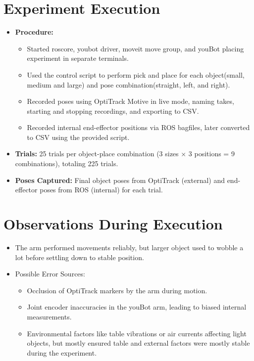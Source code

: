 \documentclass{article}
\begin{document}
\newpage

\section{Experiment Execution}
\begin{itemize}
    \item \textbf{Procedure:} 
    \begin{itemize}
        \item Started roscore, youbot driver, moveit move group, and youBot placing experiment in separate terminals.
        \item Used the control script to perform pick and place for each object(small, medium and large) and pose combination(straight, left, and right).
        \item Recorded poses using OptiTrack Motive in live mode, naming takes, starting and stopping recordings, and exporting to CSV.
        \item Recorded internal end-effector positions via ROS bagfiles, later converted to CSV using the provided script.
    \end{itemize}
    \item \textbf{Trials:} 25 trials per object-place combination (3 sizes × 3 positions = 9 combinations), totaling 225 trials.
    \item \textbf{Poses Captured:} Final object poses from OptiTrack (external) and end-effector poses from ROS (internal) for each trial.
\end{itemize}



\section{Observations During Execution}
\begin{itemize}
    \item The arm performed movements reliably, but larger object used to wobble a lot before settling down to stable position.
    \item Possible Error Sources:
    \begin{itemize}
        \item Occlusion of OptiTrack markers by the arm during motion.
        \item Joint encoder inaccuracies in the youBot arm, leading to biased internal measurements.
        \item Environmental factors like table vibrations or air currents affecting light objects, but mostly ensured table and external factors were mostly stable during the experiment.
    \end{itemize}
\end{itemize}
\end{document}
